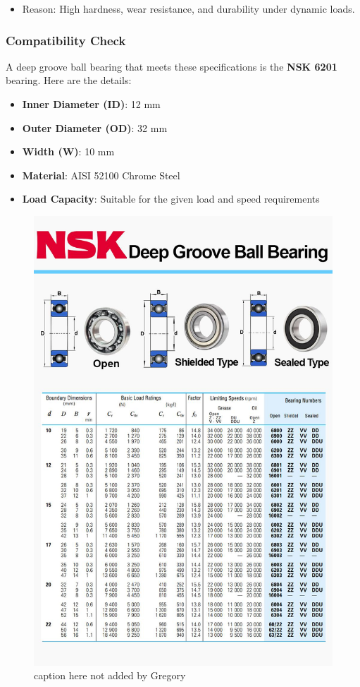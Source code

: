\documentclass[../../main]{subfiles}
\begin{document}
\begin{itemize}
\item
  Reason: High hardness, wear resistance, and durability under dynamic
  loads.
\end{itemize}

\subsubsection{Compatibility Check}

A deep groove ball bearing that meets these specifications is the
\textbf{NSK 6201} bearing. Here are the details:

\begin{itemize}
\item
  \textbf{Inner Diameter (ID)}: 12 mm
\item
  \textbf{Outer Diameter (OD)}: 32 mm
\item
  \textbf{Width (W)}: 10 mm
\item
  \textbf{Material}: AISI 52100 Chrome Steel
\item
  \textbf{Load Capacity}: Suitable for the given load and speed
  requirements
\end{itemize}

\newpage
\begin{figure}[H]
\centering
\includegraphics[width=\textwidth]{img/img1.jpg}
\caption{caption here not added by Gregory}
\end{figure}
\newpage
\end{document}
